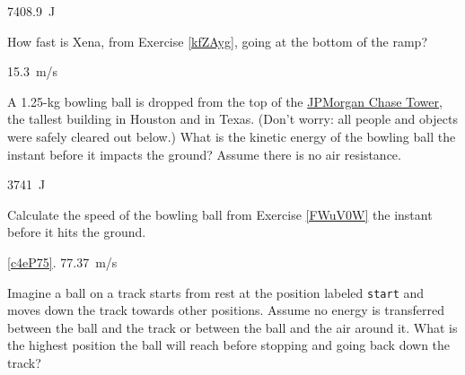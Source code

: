 \documentclass[]{exam}
\begin{document}
\begin{questions}
\begin{solution}
\SI{7408.9}{J}
\end{solution}


\question \label{5Nd1zt}
How fast is Xena, from Exercise \ref{kfZAyg}, going at the bottom of the ramp?

\begin{solution}
\SI{15.3}{m/s}
\end{solution}


\question \label{FWuV0W}
A 1.25-kg bowling ball is dropped from the top of the \href{https://en.wikipedia.org/wiki/JPMorgan_Chase_Tower_(Houston)}{JPMorgan Chase Tower}, the tallest building in Houston and in Texas. (Don't worry: all people and objects were safely cleared out below.) What is the kinetic energy of the bowling ball the instant before it impacts the ground? Assume there is no air resistance.

\begin{solution}
\SI{3741}{J}
\end{solution}

\question \label{c4eP75}
Calculate the speed of the bowling ball from Exercise \ref{FWuV0W} the instant before it hits the ground.

\begin{solution}
\ref{c4eP75}. \SI{77.37}{m/s}
\end{solution}

\question
Imagine a ball on a track starts from rest at the position labeled \texttt{start} and moves down the track towards other positions. Assume no energy is transferred between the ball and the track or between the ball and the air around it. What is the highest position the ball will reach before stopping and going back down the track? 

\begin{center}
\end{center}


\end{questions}
\end{document}
